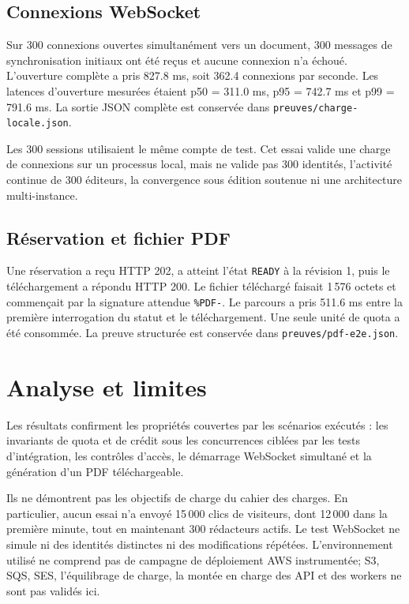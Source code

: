 \documentclass[11pt,a4paper,oneside]{report}
\begin{document}
\section{Connexions WebSocket}
Sur 300 connexions ouvertes simultanément vers un document, 300 messages de synchronisation initiaux ont été reçus et aucune connexion n’a échoué. L’ouverture complète a pris 827.8 ms, soit 362.4 connexions par seconde. Les latences d’ouverture mesurées étaient p50 = 311.0 ms, p95 = 742.7 ms et p99 = 791.6 ms. La sortie JSON complète est conservée dans \texttt{preuves/charge-locale.json}.

Les 300 sessions utilisaient le même compte de test. Cet essai valide une charge de connexions sur un processus local, mais ne valide pas 300 identités, l’activité continue de 300 éditeurs, la convergence sous édition soutenue ni une architecture multi-instance.

\section{Réservation et fichier PDF}
Une réservation a reçu HTTP 202, a atteint l’état \texttt{READY} à la révision 1, puis le téléchargement a répondu HTTP 200. Le fichier téléchargé faisait 1\,576 octets et commençait par la signature attendue \texttt{\%PDF-}. Le parcours a pris 511.6 ms entre la première interrogation du statut et le téléchargement. Une seule unité de quota a été consommée. La preuve structurée est conservée dans \texttt{preuves/pdf-e2e.json}.

\chapter{Analyse et limites}
Les résultats confirment les propriétés couvertes par les scénarios exécutés : les invariants de quota et de crédit sous les concurrences ciblées par les tests d’intégration, les contrôles d’accès, le démarrage WebSocket simultané et la génération d’un PDF téléchargeable.

Ils ne démontrent pas les objectifs de charge du cahier des charges. En particulier, aucun essai n’a envoyé 15\,000 clics de visiteurs, dont 12\,000 dans la première minute, tout en maintenant 300 rédacteurs actifs. Le test WebSocket ne simule ni des identités distinctes ni des modifications répétées. L’environnement utilisé ne comprend pas de campagne de déploiement AWS instrumentée; S3, SQS, SES, l’équilibrage de charge, la montée en charge des API et des workers ne sont pas validés ici.
\end{document}
